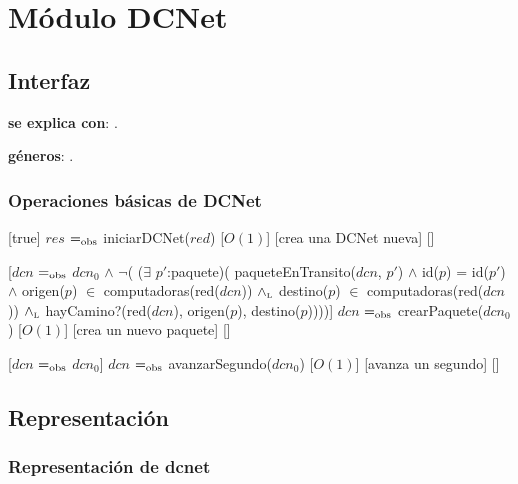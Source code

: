\section{Módulo DCNet}

\subsection{Interfaz}

\textbf{se explica con}: .

\textbf{géneros}: .

\subsubsection{Operaciones básicas de DCNet}

[true]
{$res$ $=_{\mathrm{obs}}$ iniciarDCNet($red$)}
[$O(1)$]
[crea una DCNet nueva]
[]

[$dcn$ $=_{\mathrm{obs}}$ $dcn_0$ $\land$ 
$\neg$( ($\exists$ $p'$:paquete)(	paqueteEnTransito($dcn$, $p'$) $\land$ 
									id($p$) = id($p'$) $\land$ 
									origen($p$) $\in$ computadoras(red($dcn$)) $\land_{\mathrm{\scriptscriptstyle{L}}}$ 
									destino($p$) $\in$ computadoras(red($dcn$)) $\land_{\mathrm{\scriptscriptstyle{L}}}$
									hayCamino?(red($dcn$), origen($p$), destino($p$))))]
{$dcn$ $=_{\mathrm{obs}}$ crearPaquete($dcn_0$)}
[$O(1)$]
[crea un nuevo paquete]
[]

[$dcn$ $=_{\mathrm{obs}}$ $dcn_0$]
{$dcn$ $=_{\mathrm{obs}}$ avanzarSegundo($dcn_0$)}
[$O(1)$]
[avanza un segundo]
[]

\subsection{Representación}

\subsubsection{Representación de dcnet}

